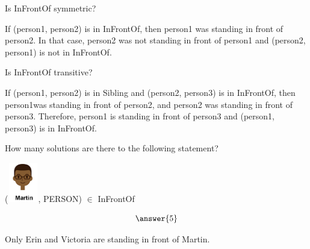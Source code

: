 \documentclass{ximera}
\begin{document}
\begin{exercise}
Is InFrontOf symmetric?

  \begin{multipleChoice}
  \end{multipleChoice}
  \begin{feedback}
  If (person1, person2) is in InFrontOf, then person1 was standing in front of person2.  In that case, person2 was not standing in front of person1 and (person2, person1) is not in InFrontOf.
  \end{feedback}
\end{exercise}





\begin{exercise}
Is InFrontOf transitive?

  \begin{multipleChoice}
  \end{multipleChoice}
  \begin{feedback}
If (person1, person2) is in Sibling and (person2, person3) is in InFrontOf, then person1was standing in front of person2, and person2 was standing in front of person3. Therefore, person1 is standing in front of person3 and (person1, person3) is in InFrontOf.
  \end{feedback}
\end{exercise}




\begin{exercise}
How many solutions are there to the following statement?  

({\includegraphics[width=50px,height=65px]{pics/people/martin.png}}, PERSON) $\in$ InFrontOf 

\[  \answer{5} \]

  \begin{feedback}
Only Erin and Victoria are standing in front of Martin.
  \end{feedback}
\end{exercise}
\end{document}

